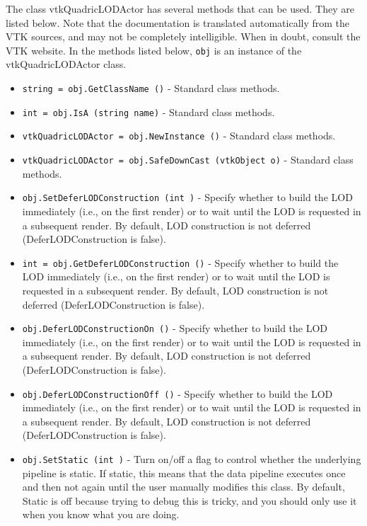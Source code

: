 The class vtkQuadricLODActor has several methods that can be used.
  They are listed below.
Note that the documentation is translated automatically from the VTK sources,
and may not be completely intelligible.  When in doubt, consult the VTK website.
In the methods listed below, \verb|obj| is an instance of the vtkQuadricLODActor class.
\begin{itemize}
\item  \verb|string = obj.GetClassName ()| -  Standard class methods.

\item  \verb|int = obj.IsA (string name)| -  Standard class methods.

\item  \verb|vtkQuadricLODActor = obj.NewInstance ()| -  Standard class methods.

\item  \verb|vtkQuadricLODActor = obj.SafeDownCast (vtkObject o)| -  Standard class methods.

\item  \verb|obj.SetDeferLODConstruction (int )| -  Specify whether to build the LOD immediately (i.e., on the first render)
 or to wait until the LOD is requested in a subsequent render. By default,
 LOD construction is not deferred (DeferLODConstruction is false).

\item  \verb|int = obj.GetDeferLODConstruction ()| -  Specify whether to build the LOD immediately (i.e., on the first render)
 or to wait until the LOD is requested in a subsequent render. By default,
 LOD construction is not deferred (DeferLODConstruction is false).

\item  \verb|obj.DeferLODConstructionOn ()| -  Specify whether to build the LOD immediately (i.e., on the first render)
 or to wait until the LOD is requested in a subsequent render. By default,
 LOD construction is not deferred (DeferLODConstruction is false).

\item  \verb|obj.DeferLODConstructionOff ()| -  Specify whether to build the LOD immediately (i.e., on the first render)
 or to wait until the LOD is requested in a subsequent render. By default,
 LOD construction is not deferred (DeferLODConstruction is false).

\item  \verb|obj.SetStatic (int )| -  Turn on/off a flag to control whether the underlying pipeline is static.
 If static, this means that the data pipeline executes once and then not 
 again until the user manually modifies this class. By default, Static is
 off because trying to debug this is tricky, and you should only use it
 when you know what you are doing.


\end{itemize}
